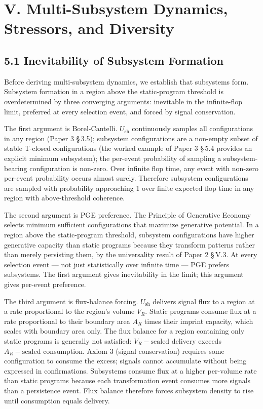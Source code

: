 \documentclass[11pt,oneside]{report}
\theoremstyle{definition}
\theoremstyle{remark}
\begin{document}
\section*{V. Multi-Subsystem Dynamics, Stressors, and Diversity}

\subsection*{5.1 Inevitability of Subsystem Formation}

Before deriving multi-subsystem dynamics, we establish that subsystems
form. Subsystem formation in a region above the static-program threshold
is overdetermined by three converging arguments: inevitable in the
infinite-flop limit, preferred at every selection event, and forced by
signal conservation.

The first argument is Borel-Cantelli. \ensuremath{U_{\mathrm{sh}}} continuously samples all
configurations in any region (Paper 3 \S\,3.5); subsystem configurations
are a non-empty subset of stable T-closed configurations (the worked
example of Paper 3 \S\,5.4 provides an explicit minimum subsystem); the
per-event probability of sampling a subsystem-bearing configuration is
non-zero. Over infinite flop time, any event with non-zero per-event
probability occurs almost surely. Therefore subsystem configurations are
sampled with probability approaching 1 over finite expected flop time in
any region with above-threshold coherence.

The second argument is PGE preference. The Principle of Generative
Economy selects minimum sufficient configurations that maximize
generative potential. In a region above the static-program threshold,
subsystem configurations have higher generative capacity than static
programs because they transform patterns rather than merely persisting
them, by the universality result of Paper 2 \S\,V.3. At every selection
event --- not just statistically over infinite time --- PGE prefers
subsystems. The first argument gives inevitability in the limit; this
argument gives per-event preference.

The third argument is flux-balance forcing. \ensuremath{U_{\mathrm{sh}}} delivers signal flux to
a region at a rate proportional to the region's volume \ensuremath{V_{R}.} Static
programs consume flux at a rate proportional to their boundary area \ensuremath{A_{R}}
times their imprint capacity, which scales with boundary area only. The
flux balance for a region containing only static programs is generally
not satisfied: \ensuremath{V_{R}-\text{scaled}} delivery exceeds \ensuremath{A_{R}-\text{scaled}} consumption.
Axiom 3 (signal conservation) requires some configuration to consume the
excess; signals cannot accumulate without being expressed in
confirmations. Subsystems consume flux at a higher per-volume rate than
static programs because each transformation event consumes more signals
than a persistence event. Flux balance therefore forces subsystem
density to rise until consumption equals delivery.
\end{document}
